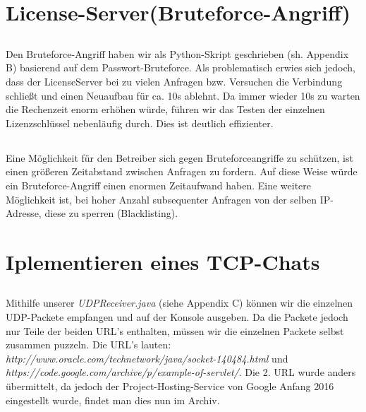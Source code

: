 \documentclass{scrartcl}
\begin{document}
  \section{License-Server(Bruteforce-Angriff)}
  \label{sec:License-Server(Bruteforce-Angriff)}
    \subsection{}
    \label{sub:4.1}
      Den Bruteforce-Angriff haben wir als Python-Skript geschrieben (sh.
      Appendix B) basierend auf dem Passwort-Bruteforce. Als problematisch
      erwies sich jedoch, dass der LicenseServer bei zu vielen Anfragen bzw.
      Versuchen die Verbindung schließt und einen Neuaufbau für ca. 10s
      ablehnt. Da immer wieder 10s zu warten die Rechenzeit enorm erhöhen
      würde, führen wir das Testen der einzelnen Lizenzschlüssel nebenläufig
      durch. Dies ist deutlich effizienter.
    \subsection{}
    \label{sub:4.2}
      Eine Möglichkeit für den Betreiber sich gegen Bruteforceangriffe zu
      schützen, ist einen größeren Zeitabstand zwischen Anfragen zu fordern.
      Auf diese Weise würde ein Bruteforce-Angriff einen enormen Zeitaufwand
      haben. Eine weitere Möglichkeit ist, bei hoher Anzahl subsequenter
      Anfragen von der selben IP-Adresse, diese zu sperren (Blacklisting).
    \subsection{}
    \label{sub:4.3}

  \section{Iplementieren eines TCP-Chats}
  \label{sec:Iplementieren eines TCP-Chats}
    \subsection{}
    \label{sub:5.1}
      Mithilfe unserer \textit{UDPReceiver.java} (siehe Appendix C) können wir
      die einzelnen UDP-Packete empfangen und auf der Konsole ausgeben.
      Da die Packete jedoch nur Teile der beiden URL's enthalten, müssen wir
      die einzelnen Packete selbst zusammen puzzeln. Die URL's lauten:
      \textit{http://www.oracle.com/technetwork/java/socket-140484.html} und\\
      \textit{https://code.google.com/archive/p/example-of-servlet/}. Die
      2. URL wurde anders übermittelt, da jedoch der Project-Hosting-Service
      von Google Anfang 2016 eingestellt wurde, findet man dies nun im Archiv.
\end{document}
